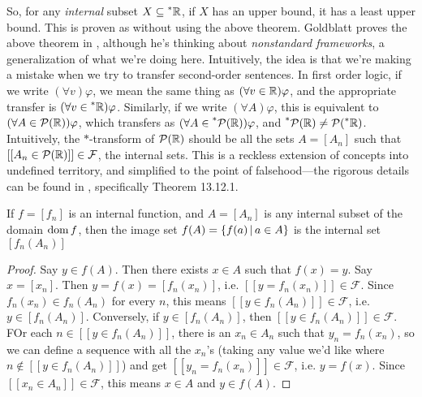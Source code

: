 So, for any \textit{internal} subset $X \subseteq \prescript{*}{}{\mathbb{R}}$, if $X$ has an upper bound, it has a least upper bound. This is proven as \cite[Theorem~11.5.1]{goldblatt1998} without using the above theorem. Goldblatt proves the above theorem in \cite[Theorem~13.12.1]{goldblatt1998}, although he's thinking about \textit{nonstandard frameworks}, a generalization of what we're doing here. Intuitively, the idea is that we're making a mistake when we try to transfer second-order sentences. In first order logic, if we write $(\forall v) \varphi$, we mean the same thing as $(\forall v \in \mathbb{R}) \varphi$, and the appropriate transfer is $(\forall v \in \prescript{*}{}{\mathbb{R}}) \varphi$. Similarly, if we write $(\forall A) \varphi$, this is equivalent to $(\forall A \in \mathcal{P}(\mathbb{R})) \varphi$, which transfers as $(\forall A \in \prescript{*}{}{\mathcal{P}(\mathbb{R})}) \varphi$, and $\prescript{*}{}{\mathcal{P}(\mathbb{R})} \neq \mathcal{P}(\prescript{*}{}{\mathbb{R}})$. Intuitively, the $\ast$-transform of $\mathcal{P}(\mathbb{R})$ should be all the sets $A = [A_n]$ such that $[[A_n \in \mathcal{P}(\mathbb{R})]] \in \mathcal{F}$, the internal sets. This is a reckless extension of concepts into undefined territory, and simplified to the point of falsehood---the rigorous details can be found in \cite[Chapter~13]{goldblatt1998}, specifically Theorem 13.12.1.

\begin{thm}{}\label{imageInternalSetIsInternal}
    If $f = [f_n]$ is an internal function, and $A = [A_n]$ is any internal subset of the domain $\operatorname{dom} f$, then the image set $f(A) = \{f(a) \,|\, a \in A\}$ is the internal set $[f_n(A_n)]$
\end{thm}

\begin{proof}
    Say $y \in f(A)$. Then there exists $x \in A$ such that $f(x) = y$. Say $x = [x_n]$. Then $y = f(x) = [f_n(x_n)]$, i.e. $[[y = f_n(x_n)]] \in \mathcal{F}$. Since $f_n(x_n) \in f_n(A_n)$ for every $n$, this means $[[y \in f_n(A_n)]] \in \mathcal{F}$, i.e. $y \in [f_n(A_n)]$. Conversely, if $y \in [f_n(A_n)]$, then $[[y \in f_n(A_n)]] \in \mathcal{F}$. FOr each $n \in [[y \in f_n(A_n)]]$, there is an $x_n \in A_n$ such that $y_n = f_n(x_n)$, so we can define a sequence with all the $x_n$'s (taking any value we'd like where $n \notin [[y \in f_n(A_n)]]$) and get $[[y_n = f_n(x_n)]] \in \mathcal{F}$, i.e. $y = f(x)$. Since $[[x_n \in A_n]] \in \mathcal{F}$, this means $x \in A$ and $y \in f(A)$.
\end{proof}

